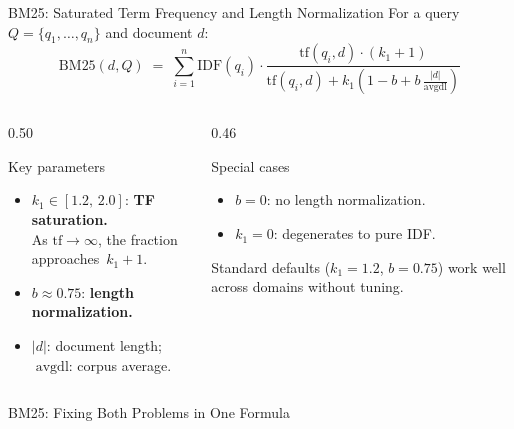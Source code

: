 \documentclass[aspectratio=169]{beamer}
\begin{document}
\begin{frame}{BM25: Saturated Term Frequency and Length Normalization}
For a query $Q = \{q_1,\dots,q_n\}$ and document $d$:
\[
\mathrm{BM25}(d,Q)\;=\;\sum_{i=1}^{n}
\mathrm{IDF}(q_i)\cdot
\frac{\mathrm{tf}(q_i,d)\cdot(k_1+1)}
     {\displaystyle\mathrm{tf}(q_i,d)+k_1\!\left(1-b+b\,\frac{|d|}{\mathrm{avgdl}}\right)}
\]
 
\vspace{0.12cm}
\begin{columns}[T]
\begin{column}{0.50\textwidth}
\begin{block}{Key parameters}
\begin{itemize}
    \item $k_1\in[1.2,\,2.0]$: \textbf{TF saturation.}\\
    As $\mathrm{tf}\to\infty$, the fraction approaches~$k_1+1$.
    \item $b\approx 0.75$: \textbf{length normalization.}
    \item $|d|$: document length; $\;\mathrm{avgdl}$: corpus average.
\end{itemize}
\end{block}
\end{column}
\begin{column}{0.46\textwidth}
\begin{block}{Special cases}
\begin{itemize}
    \item $b=0$: no length normalization.
    \item $k_1=0$: degenerates to pure IDF.
\end{itemize}
Standard defaults ($k_1\!=\!1.2$, $b\!=\!0.75$) work well across domains without tuning.
\end{block}
\end{column}
\end{columns}
\end{frame}
%
%
\begin{frame}{BM25: Fixing Both Problems in One Formula}


\medskip

\begin{center}
\end{center}
\end{frame}
\end{document}
